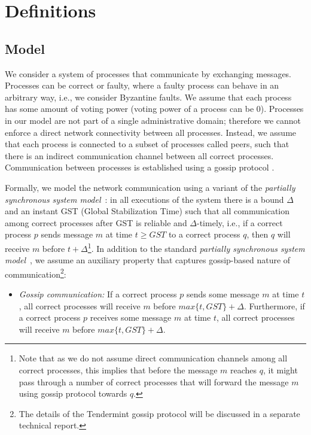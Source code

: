 \section{Definitions} \label{sec:definitions}

\subsection{Model}

We consider a system of processes that communicate by exchanging messages.
Processes can be correct or faulty, where a faulty process can behave in an
arbitrary way, i.e., we consider Byzantine faults. We assume that each process
has some amount of voting power (voting power of a process can be $0$).
Processes in our model are not part of a single administrative domain;
therefore we cannot enforce a direct network connectivity between all
processes. Instead, we assume that each process is connected to a subset of
processes called peers, such that there is an indirect communication channel
between all correct processes. Communication between processes is established
using a gossip protocol \cite{Dem1987:gossip}.

Formally, we model the network communication using a variant of the \emph{partially
synchronous system model}~\cite{DLS88:jacm}: in all executions of the system
there is a bound $\Delta$ and an instant GST (Global Stabilization Time) such
that all communication among correct processes after GST is reliable and
$\Delta$-timely, i.e., if a correct process $p$ sends message $m$ at time $t
\ge GST$ to a correct process $q$, then $q$ will receive $m$ before $t +
\Delta$\footnote{Note that as we do not assume direct communication channels
    among all correct processes, this implies that before the message $m$
    reaches $q$, it might pass through a number of correct processes that will
forward the message $m$ using gossip protocol towards $q$.}. 
In addition to the standard \emph{partially
	synchronous system model}~\cite{DLS88:jacm}, we assume an auxiliary property 
that captures gossip-based nature of communication\footnote{The details of the Tendermint gossip protocol will be discussed in a separate
	technical report. }:


\begin{itemize} \item \emph{Gossip communication:} If a correct process $p$
	sends some message $m$ at time $t$, all correct processes will receive
	$m$ before $max\{t, GST\} + \Delta$. Furthermore, if a correct process $p$
	receives some message $m$ at time $t$, all correct processes will receive
	$m$ before $max\{t, GST\} + \Delta$.    \end{itemize}


